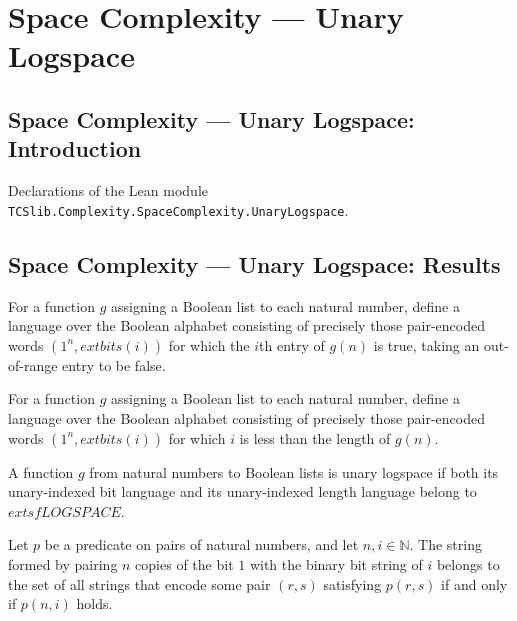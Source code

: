 \section{Space Complexity --- Unary Logspace}
\subsection*{Space Complexity --- Unary Logspace: Introduction}

Declarations of the Lean module \texttt{TCSlib.Complexity.SpaceComplexity.UnaryLogspace}.

\subsection*{Space Complexity --- Unary Logspace: Results}

\begin{definition}
\label{Complexity.uBit}
\leanok
{}
For a function $g$ assigning a Boolean list to each natural number, define a language
over the Boolean alphabet consisting of precisely those pair-encoded words
$(1^n,	ext{bits}(i))$ for which the $i$th entry of $g(n)$ is true, taking an
out-of-range entry to be false.
\end{definition}

\begin{definition}
\label{Complexity.uLen}
\leanok
{}
For a function $g$ assigning a Boolean list to each natural number, define a language
over the Boolean alphabet consisting of precisely those pair-encoded words
$(1^n,	ext{bits}(i))$ for which $i$ is less than the length of $g(n)$.
\end{definition}

\begin{definition}
\label{Complexity.UnaryLogspace}
\leanok
{}
A function $g$ from natural numbers to Boolean lists is unary logspace if both its
unary-indexed bit language and its unary-indexed length language belong to
$	extsf{LOGSPACE}$.
\end{definition}

\begin{lemma}
\label{Complexity.mem_unaryIdx}
\leanok
{}
Let $p$ be a predicate on pairs of natural numbers, and let $n,i\in\mathbb{N}$. The
string formed by pairing $n$ copies of the bit $1$ with the binary bit string of $i$
belongs to the set of all strings that encode some pair $(r,s)$ satisfying $p(r,s)$ if
and only if $p(n,i)$ holds.
\end{lemma}

